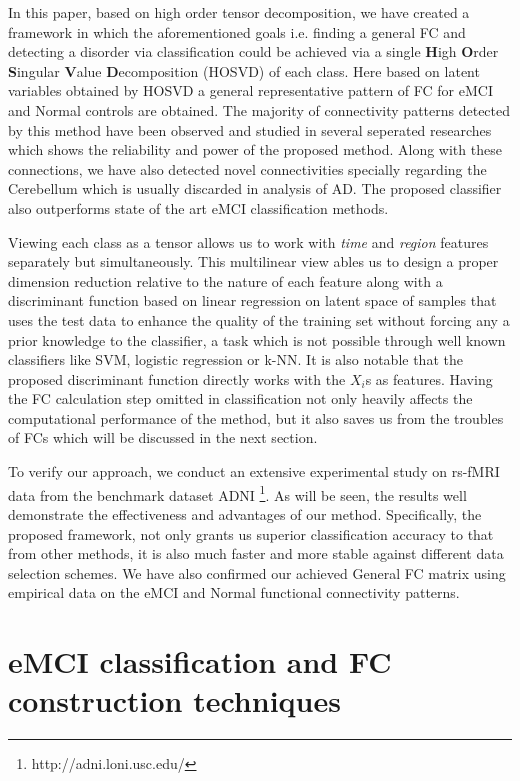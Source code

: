 \documentclass[preprint,12pt]{elsarticle}
\begin{document}
						
	In this paper, based on high order tensor decomposition, we have created a framework in which the aforementioned goals i.e. finding a general FC and detecting a disorder via classification could be achieved via a single \textbf{H}igh \textbf{O}rder \textbf{S}ingular \textbf{V}alue \textbf{D}ecomposition (HOSVD) of each class.
	 Here based on latent variables obtained by HOSVD a general representative pattern of FC for eMCI and Normal controls are obtained. 
	 The majority of connectivity patterns detected by this method have been observed and studied in several seperated researches which shows the reliability and power of the proposed method. Along with these connections, we have also detected novel connectivities specially regarding the Cerebellum which is usually discarded in analysis of AD.     
	 The proposed classifier also outperforms state of the art eMCI classification methods. 
	 
	 Viewing each class as a tensor allows us to work with \textit{time} and \textit{region} features separately but simultaneously. This multilinear view
	  ables us to design a proper dimension reduction relative to the nature of each feature along with a discriminant function based on linear regression on latent space of samples that uses the test data to enhance the quality of the training set without forcing any a prior knowledge to the classifier, a task which is not possible through well known classifiers like SVM, logistic regression or k-NN. It is also notable that the proposed discriminant function directly works with the $X_i$s as features. Having the FC calculation step omitted in classification not only heavily affects the computational performance of the method, but it also saves us from the troubles of FCs which will be discussed in the next section.   
	  
	  To verify our approach, we conduct an extensive experimental study on rs-fMRI data from the
	  	benchmark dataset ADNI
	  	\footnote{http://adni.loni.usc.edu/}.
	  	As will be seen, the results well demonstrate the effectiveness and advantages of our method. Specifically, the proposed framework, not only grants us superior classification accuracy to that from other methods, it is also much faster and more stable against different data selection schemes. We have also confirmed our achieved General FC matrix using empirical data on the eMCI and Normal functional connectivity patterns.
	  	
							 
	\section{eMCI classification and FC construction techniques}\label{related_works}
\end{document}
